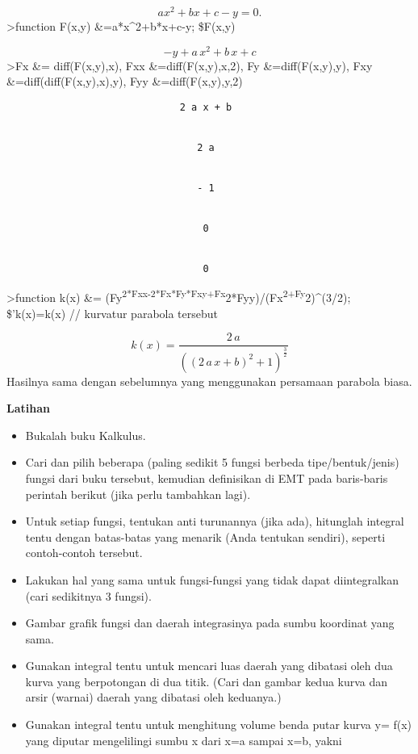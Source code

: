 \documentclass[
]{book}
\providecommand{\tightlist}{%
  \setlength{\itemsep}{0pt}\setlength{\parskip}{0pt}}
\begin{document}
\[ax^2+bx+c-y=0.\]\textgreater function F(x,y) \&=a*x\^{}2+b*x+c-y; \$F(x,y)

\[-y+a\,x^2+b\,x+c\]\textgreater Fx \&= diff(F(x,y),x), Fxx \&=diff(F(x,y),x,2), Fy \&=diff(F(x,y),y), Fxy \&=diff(diff(F(x,y),x),y), Fyy \&=diff(F(x,y),y,2)

\begin{verbatim}
                              2 a x + b


                                 2 a


                                 - 1


                                  0


                                  0
\end{verbatim}

\textgreater function k(x) \&= (Fy\textsuperscript{2*Fxx-2*Fx*Fy*Fxy+Fx}2*Fyy)/(Fx\textsuperscript{2+Fy}2)\^{}(3/2); \$'k(x)=k(x) // kurvatur parabola tersebut

\[k\left(x\right)=\frac{2\,a}{\left(\left(2\,a\,x+b\right)^2+1\right)  ^{\frac{3}{2}}}\]Hasilnya sama dengan sebelumnya yang menggunakan persamaan parabola biasa.

\textbf{Latihan}

\begin{itemize}
\tightlist
\item
  Bukalah buku Kalkulus.
\item
  Cari dan pilih beberapa (paling sedikit 5 fungsi berbeda tipe/bentuk/jenis) fungsi dari buku tersebut, kemudian definisikan di EMT pada baris-baris perintah berikut (jika perlu tambahkan lagi).
\item
  Untuk setiap fungsi, tentukan anti turunannya (jika ada), hitunglah integral tentu dengan batas-batas yang menarik (Anda tentukan sendiri), seperti contoh-contoh tersebut.
\item
  Lakukan hal yang sama untuk fungsi-fungsi yang tidak dapat diintegralkan (cari sedikitnya 3 fungsi).
\item
  Gambar grafik fungsi dan daerah integrasinya pada sumbu koordinat yang sama.
\item
  Gunakan integral tentu untuk mencari luas daerah yang dibatasi oleh dua kurva yang berpotongan di dua titik. (Cari dan gambar kedua kurva dan arsir (warnai) daerah yang dibatasi oleh keduanya.)
\item
  Gunakan integral tentu untuk menghitung volume benda putar kurva y= f(x) yang diputar mengelilingi sumbu x dari x=a sampai x=b, yakni
\end{itemize}
\end{document}
